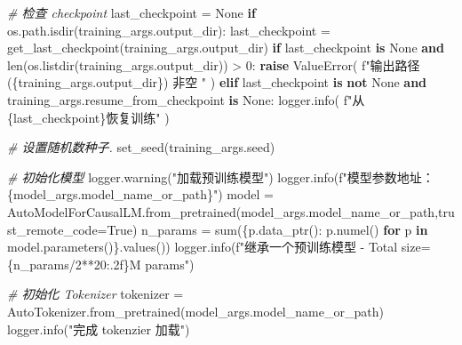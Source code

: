 \documentclass[
]{article}
\newenvironment{Shaded}{}{}
\newcommand{\BuiltInTok}[1]{\textcolor[rgb]{0.00,0.50,0.00}{#1}}
\newcommand{\CommentTok}[1]{\textcolor[rgb]{0.38,0.63,0.69}{\textit{#1}}}
\newcommand{\ControlFlowTok}[1]{\textcolor[rgb]{0.00,0.44,0.13}{\textbf{#1}}}
\newcommand{\DecValTok}[1]{\textcolor[rgb]{0.25,0.63,0.44}{#1}}
\newcommand{\KeywordTok}[1]{\textcolor[rgb]{0.00,0.44,0.13}{\textbf{#1}}}
\newcommand{\NormalTok}[1]{#1}
\newcommand{\OperatorTok}[1]{\textcolor[rgb]{0.40,0.40,0.40}{#1}}
\newcommand{\PreprocessorTok}[1]{\textcolor[rgb]{0.74,0.48,0.00}{#1}}
\newcommand{\SpecialCharTok}[1]{\textcolor[rgb]{0.25,0.44,0.63}{#1}}
\newcommand{\SpecialStringTok}[1]{\textcolor[rgb]{0.73,0.40,0.53}{#1}}
\newcommand{\StringTok}[1]{\textcolor[rgb]{0.25,0.44,0.63}{#1}}
\newcommand{\VariableTok}[1]{\textcolor[rgb]{0.10,0.09,0.49}{#1}}
\begin{document}
\begin{Shaded}
\begin{Highlighting}[]
\CommentTok{\# 检查 checkpoint}
\NormalTok{last\_checkpoint }\OperatorTok{=} \VariableTok{None}
\ControlFlowTok{if}\NormalTok{ os.path.isdir(training\_args.output\_dir):}
\NormalTok{    last\_checkpoint }\OperatorTok{=}\NormalTok{ get\_last\_checkpoint(training\_args.output\_dir)}
    \ControlFlowTok{if}\NormalTok{ last\_checkpoint }\KeywordTok{is} \VariableTok{None} \KeywordTok{and} \BuiltInTok{len}\NormalTok{(os.listdir(training\_args.output\_dir)) }\OperatorTok{\textgreater{}} \DecValTok{0}\NormalTok{:}
        \ControlFlowTok{raise} \PreprocessorTok{ValueError}\NormalTok{(}
            \SpecialStringTok{f"输出路径 (}\SpecialCharTok{\{}\NormalTok{training\_args}\SpecialCharTok{.}\NormalTok{output\_dir}\SpecialCharTok{\}}\SpecialStringTok{) 非空 "}
\NormalTok{        )}
    \ControlFlowTok{elif}\NormalTok{ last\_checkpoint }\KeywordTok{is} \KeywordTok{not} \VariableTok{None} \KeywordTok{and}\NormalTok{ training\_args.resume\_from\_checkpoint }\KeywordTok{is} \VariableTok{None}\NormalTok{:}
\NormalTok{        logger.info(}
            \SpecialStringTok{f"从 }\SpecialCharTok{\{}\NormalTok{last\_checkpoint}\SpecialCharTok{\}}\SpecialStringTok{恢复训练"}
\NormalTok{        )}

\CommentTok{\# 设置随机数种子.}
\NormalTok{set\_seed(training\_args.seed)}

\CommentTok{\# 初始化模型}
\NormalTok{logger.warning(}\StringTok{"加载预训练模型"}\NormalTok{)}
\NormalTok{logger.info(}\SpecialStringTok{f"模型参数地址：}\SpecialCharTok{\{}\NormalTok{model\_args}\SpecialCharTok{.}\NormalTok{model\_name\_or\_path}\SpecialCharTok{\}}\SpecialStringTok{"}\NormalTok{)}
\NormalTok{model }\OperatorTok{=}\NormalTok{ AutoModelForCausalLM.from\_pretrained(model\_args.model\_name\_or\_path,trust\_remote\_code}\OperatorTok{=}\VariableTok{True}\NormalTok{)}
\NormalTok{n\_params }\OperatorTok{=} \BuiltInTok{sum}\NormalTok{(\{p.data\_ptr(): p.numel() }\ControlFlowTok{for}\NormalTok{ p }\KeywordTok{in}\NormalTok{ model.parameters()\}.values())}
\NormalTok{logger.info(}\SpecialStringTok{f"继承一个预训练模型 {-} Total size=}\SpecialCharTok{\{}\NormalTok{n\_params}\OperatorTok{/}\DecValTok{2}\OperatorTok{**}\DecValTok{20}\SpecialCharTok{:.2f\}}\SpecialStringTok{M params"}\NormalTok{)}

\CommentTok{\# 初始化 Tokenizer}
\NormalTok{tokenizer }\OperatorTok{=}\NormalTok{ AutoTokenizer.from\_pretrained(model\_args.model\_name\_or\_path)}
\NormalTok{logger.info(}\StringTok{"完成 tokenzier 加载"}\NormalTok{)}


\end{Highlighting}
\end{Shaded}
\end{document}
